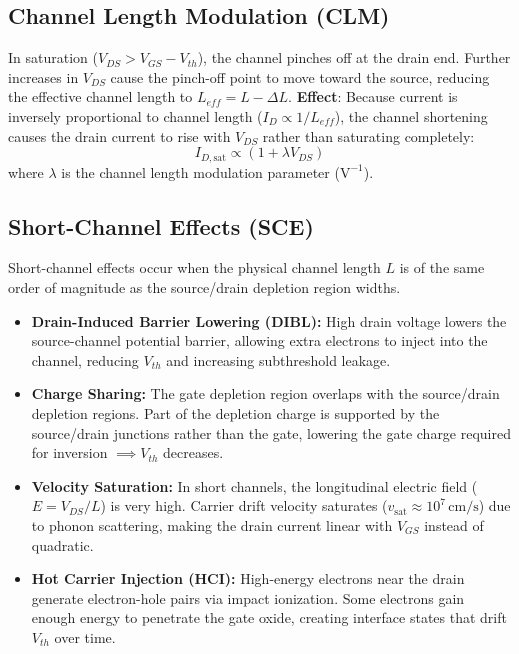 \documentclass[12pt,a4paper]{article}
\begin{document}
\subsection{Channel Length Modulation (CLM)}
In saturation ($V_{DS} > V_{GS} - V_{th}$), the channel pinches off at the drain end. Further increases in $V_{DS}$ cause the pinch-off point to move toward the source, reducing the effective channel length to $L_{eff} = L - \Delta L$.
\textbf{Effect}: Because current is inversely proportional to channel length ($I_D \propto 1/L_{eff}$), the channel shortening causes the drain current to rise with $V_{DS}$ rather than saturating completely:
  \begin{equation}
    I_{D,\text{sat}} \propto \left( 1 + \lambda V_{DS} \right)
  \end{equation}
  where $\lambda$ is the channel length modulation parameter ($\text{V}^{-1}$).

\subsection{Short-Channel Effects (SCE)}
Short-channel effects occur when the physical channel length $L$ is of the same order of magnitude as the source/drain depletion region widths.
\begin{itemize}[leftmargin=*, itemsep=3.5pt]
  \item \textbf{Drain-Induced Barrier Lowering (DIBL):} High drain voltage lowers the source-channel potential barrier, allowing extra electrons to inject into the channel, reducing $V_{th}$ and increasing subthreshold leakage.
  \item \textbf{Charge Sharing:} The gate depletion region overlaps with the source/drain depletion regions. Part of the depletion charge is supported by the source/drain junctions rather than the gate, lowering the gate charge required for inversion $\implies V_{th}$ decreases.
  \item \textbf{Velocity Saturation:} In short channels, the longitudinal electric field ($E = V_{DS}/L$) is very high. Carrier drift velocity saturates ($v_{\text{sat}} \approx 10^7\,\text{cm/s}$) due to phonon scattering, making the drain current linear with $V_{GS}$ instead of quadratic.
  \item \textbf{Hot Carrier Injection (HCI):} High-energy electrons near the drain generate electron-hole pairs via impact ionization. Some electrons gain enough energy to penetrate the gate oxide, creating interface states that drift $V_{th}$ over time.
\end{itemize}
\end{document}
